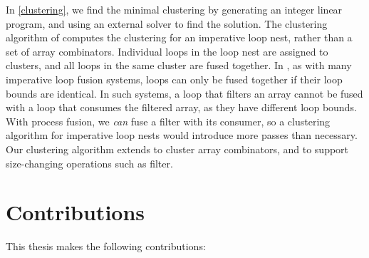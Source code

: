 In \cref{clustering}, we find the minimal clustering by generating an integer linear program, and using an external solver to find the solution.
The clustering algorithm of \citet{megiddo1998optimal} computes the clustering for an imperative loop nest, rather than a set of array combinators.
Individual loops in the loop nest are assigned to clusters, and all loops in the same cluster are fused together.
In \citet{megiddo1998optimal}, as with many imperative loop fusion systems, loops can only be fused together if their loop bounds are identical.
In such systems, a loop that filters an array cannot be fused with a loop that consumes the filtered array, as they have different loop bounds.
With process fusion, we \emph{can} fuse a filter with its consumer, so a clustering algorithm for imperative loop nests would introduce more passes than necessary.
Our clustering algorithm extends \citet{megiddo1998optimal} to cluster array combinators, and to support size-changing operations such as filter.

\section{Contributions}

This thesis makes the following contributions:

